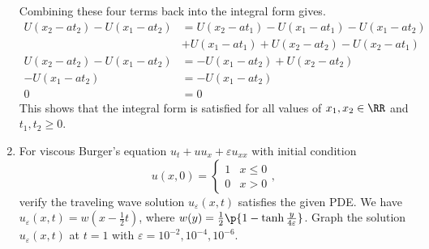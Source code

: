 \documentclass[11pt, oneside]{article}
\begin{document}
\begin{enumerate}
    Combining these four terms back into the integral form gives.
    \begin{align*}
      U(x_2 - at_2) - U(x_1 - at_2) &= U(x_2 - at_1) - U(x_1 - at_1) - U(x_1 - at_2) \\
        &+ U(x_1 - at_1) + U(x_2 - at_2) - U(x_2 - at_1) \\
      U(x_2 - at_2) - U(x_1 - at_2) &= - U(x_1 - at_2) + U(x_2 - at_2) \\
      - U(x_1 - at_2) &= - U(x_1 - at_2)  \\
      0 &= 0
    \end{align*}
    This shows that the integral form is satisfied for all values of $x_1, x_2 \in \RR$ and $t_1, t_2 \ge 0$.

  \item %
    For viscous Burger's equation $u_t + uu_x + \varepsilon u_{xx}$ with initial condition
    \[
      u(x, 0) =
      \begin{cases}
        1 & x \le 0 \\
        0 & x > 0
      \end{cases},
    \]
    verify the traveling wave solution $u_{\varepsilon}(x, t)$ satisfies the given PDE.\@
    We have $u_{\varepsilon}(x, t) = w(x - \frac{1}{2}t)$, where
    $w(y) = \frac{1}{2}\p{1 - \tanh{\frac{y}{4\varepsilon}}}$.
    Graph the solution $u_{\varepsilon}(x, t)$ at $t = 1$ with
    $\varepsilon = 10^{-2}, 10^{-4}, 10^{-6}$.


\end{enumerate}
\end{document}
